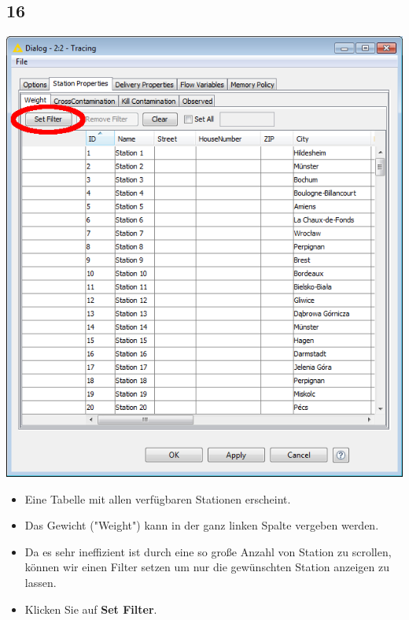 \documentclass{beamer}
\begin{document}
\subsection{16}
\begin{frame}
	\begin{center}
  		\includegraphics[height=0.5\textheight]{16.png}
	\end{center}
	\begin{itemize}
		\item Eine Tabelle mit allen verfügbaren Stationen erscheint.
		\item Das Gewicht ("Weight") kann in der ganz linken Spalte vergeben werden.
		\item Da es sehr ineffizient ist durch eine so große Anzahl von Station zu scrollen, können wir einen Filter setzen um nur die gewünschten Station anzeigen zu lassen.
		\item Klicken Sie auf \textbf{Set Filter}.
	\end{itemize}
\end{frame}
\end{document}
